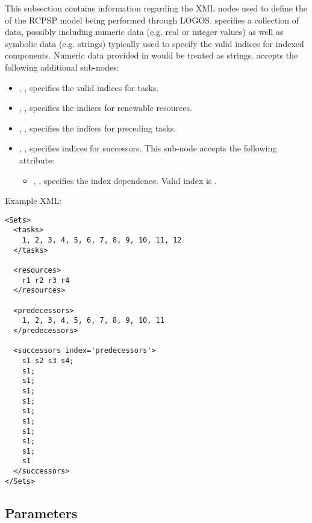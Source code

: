 This subsection contains information regarding the XML nodes used to define the
 of the RCPSP model being performed through LOGOS.
 specifies a collection of data, possibly including
numeric data (e.g. real or integer values) as well as symbolic data (e.g. strings)
typically used to specify the valid indices for indexed components.
\nb Numeric data provided in  would be treated as strings.
 accepts the following additional sub-nodes:
\begin{itemize}
  \item {}, , specifies
  the valid indices for tasks.
  \item {}, ,
  specifies the indices for renewable resources.
  \item {}, ,
  specifies the indices for preceding tasks.
  \item {}, ,
  specifies indices for successors.
  This sub-node accepts the following attribute:
  \begin{itemize}
    \item {}, , specifies the index dependence.
    Valid index is .
  \end{itemize}
\end{itemize}

Example XML:
\begin{lstlisting}[style=XML]
<Sets>
  <tasks>
    1, 2, 3, 4, 5, 6, 7, 8, 9, 10, 11, 12
  </tasks>

  <resources>
    r1 r2 r3 r4
  </resources>

  <predecessors>
    1, 2, 3, 4, 5, 6, 7, 8, 9, 10, 11
  </predecessors>

  <successors index='predecessors'>
    s1 s2 s3 s4;
    s1;
    s1;
    s1;
    s1;
    s1;
    s1;
    s1;
    s1;
    s1;
    s1
  </successors>
</Sets>
\end{lstlisting}


\subsection{Parameters}
\label{subsec:rcpsp_params}

